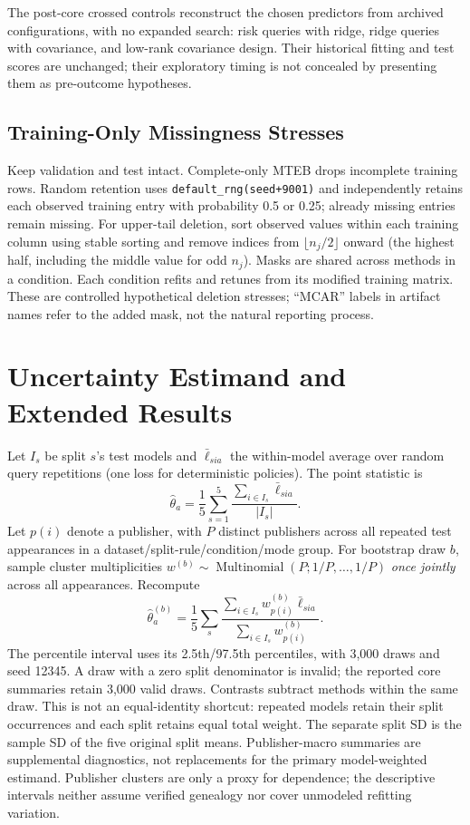 \documentclass{article}
\begin{document}
The post-core crossed controls reconstruct the chosen predictors from archived configurations, with no expanded search: risk queries with ridge, ridge queries with covariance, and low-rank covariance design. Their historical fitting and test scores are unchanged; their exploratory timing is not concealed by presenting them as pre-outcome hypotheses.

\subsection{Training-Only Missingness Stresses}
Keep validation and test intact. Complete-only MTEB drops incomplete training rows. Random retention uses \texttt{default\_rng(seed+9001)} and independently retains each observed training entry with probability 0.5 or 0.25; already missing entries remain missing. For upper-tail deletion, sort observed values within each training column using stable sorting and remove indices from $\lfloor n_j/2\rfloor$ onward (the highest half, including the middle value for odd $n_j$). Masks are shared across methods in a condition. Each condition refits and retunes from its modified training matrix. These are controlled hypothetical deletion stresses; ``MCAR'' labels in artifact names refer to the added mask, not the natural reporting process.

\section{Uncertainty Estimand and Extended Results}
\label{app:uncertainty}
Let $I_s$ be split $s$'s test models and $\bar\ell_{sia}$ the within-model average over random query repetitions (one loss for deterministic policies). The point statistic is
\begin{equation}
\hat\theta_a=\frac15\sum_{s=1}^{5}\frac{\sum_{i\in I_s}\bar\ell_{sia}}{|I_s|}.
\end{equation}
Let $p(i)$ denote a publisher, with $P$ distinct publishers across all repeated test appearances in a dataset/split-rule/condition/mode group. For bootstrap draw $b$, sample cluster multiplicities $w^{(b)}\sim\operatorname{Multinomial}(P;1/P,\ldots,1/P)$ \emph{once jointly} across all appearances. Recompute
\begin{equation}
\hat\theta^{(b)}_a=\frac15\sum_s
\frac{\sum_{i\in I_s}w^{(b)}_{p(i)}\bar\ell_{sia}}{\sum_{i\in I_s}w^{(b)}_{p(i)}}.
\end{equation}
The percentile interval uses its 2.5th/97.5th percentiles, with 3,000 draws and seed 12345. A draw with a zero split denominator is invalid; the reported core summaries retain 3,000 valid draws. Contrasts subtract methods within the same draw. This is not an equal-identity shortcut: repeated models retain their split occurrences and each split retains equal total weight. The separate split SD is the sample SD of the five original split means. Publisher-macro summaries are supplemental diagnostics, not replacements for the primary model-weighted estimand. Publisher clusters are only a proxy for dependence; the descriptive intervals neither assume verified genealogy nor cover unmodeled refitting variation.
\end{document}
